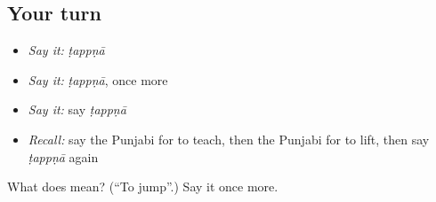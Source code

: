 \subsection*{Your turn}
\begin{itemize}
\raggedright
  \item \emph{Say it:} \emph{ṭappṇā}
  \item \emph{Say it:} \emph{ṭappṇā}, once more
  \item \emph{Say it:} say \emph{ṭappṇā}
  \item \emph{Recall:} say the Punjabi for to teach, then the Punjabi for to lift, then say \emph{ṭappṇā} again
\end{itemize}

\begin{tcolorbox}[breakable,colback=teal!4,colframe=teal!35!black,title={Before you move on}]
What does  mean? (\textquotedblleft{}To jump\textquotedblright{}.) Say it once more.
\end{tcolorbox}
